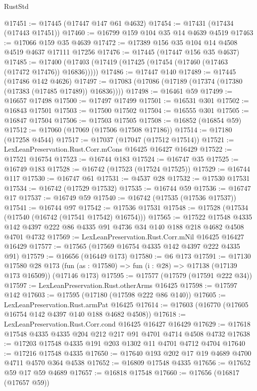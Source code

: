 \begin{lexlean}{RustStd}
\begin{coremodule}
@17451 := @17445 (@17447 @147 @61 @4632)
@17454 := @17431 (@17434 (@17443 @17451))
@17460 := @16799 @159 @104 @35 @14 @4639 @4519
@17463 := @17066 @159 @35 @4639
@17472 := @17389 @156 @35 @104 @14 @4508 @4519 @4637 @17111 @17256
@17476 := @17445 (@17447 @156 @35 @4637)
@17485 := @17400 (@17403 (@17419 (@17425 (@17454 (@17460 (@17463 (@17472 @17476)) @16836)))))
@17486 := @17447 @140
@17489 := @17445 (@17486 @142 @4626)
@17497 := @17083 (@17086 (@17189 (@17374 (@17380 (@17383 (@17485 @17489)) @16836))))
@17498 := @16461 @59
@17499 := @16657 @17498
@17500 := @17497 @17499
@17501 := @16531 @301
@17502 := @16843 @17501
@17503 := @17500 @17502
@17504 := @16555 @301
@17505 := @16847 @17504
@17506 := @17503 @17505
@17508 := @16852 (@16854 @59)
@17512 := @17060 (@17069 (@17506 @17508 @17186))
@17514 := @17180 (@17258 @4544)
@17517 := @17037 (@17047 (@17512 @17514))
@17521 := LexLeanPreservation.Rust.Corr.mCons @16425 @16427 @16429
@17522 := @17521 @16754
@17523 := @16744 @183
@17524 := @16747 @35
@17525 := @16749 @183
@17528 := @16742 (@17523 (@17524 @17525))
@17529 := @16744 @117
@17530 := @16747 @61
@17531 := @4537 @28
@17532 := @17530 @17531
@17534 := @16742 (@17529 @17532)
@17535 := @16744 @59
@17536 := @16747 @17
@17537 := @16749 @59
@17540 := @16742 (@17535 (@17536 @17537))
@17541 := @16744 @97
@17542 := @17536 @17531
@17548 := @17528 (@17534 (@17540 (@16742 (@17541 @17542) @16754)))
@17565 := @17522
    @17548
    @4335
    @142
    @4397
    @222
    @86
    @4335
    @91
    @4736
    @34
    @140
    @188
    @218
    @4682
    @4508
    @4701
    @4732
@17569 := LexLeanPreservation.Rust.Corr.mNil @16425 @16427 @16429
@17577 := @17565 (@17569 @16754 @4335 @142 @4397 @222 @4335 @91)
@17579 := @16656 (@16449 @173)
@17580 := @6 @173
@17591 := @17130
    @17580
    @28
    @173
    (fun (as : @17580) => fun (i : @28) => @17138 (@17139 @173 @16509))
    (@17146 @173)
@17595 := @17577 (@17579 (@17591 @222 @34))
@17597 := LexLeanPreservation.Rust.otherArms @16425
@17598 := @17597 @142
@17603 := @17595 (@17180 (@17598 @222 @86 @140))
@17605 := LexLeanPreservation.Rust.armPat @16425
@17614 := @17603 (@16770 (@17605 @16754 @142 @4397 @140 @188 @4682 @4508))
@17618 := LexLeanPreservation.Rust.Corr.cond @16425 @16427 @16429
@17629 := @17618 @17548 @4335 @4335 @204 @212 @217 @91 @4701 @4714 @4508 @4732
@17638 := @17203 @17548 @4335 @191 @203 @1302 @11 @4701 @4712 @4704
@17640 := @17216 @17548 @4335
@17650 := @17640 @193 @202 @17 @19 @4689 @4700 @4711 @4570 @364 @4538
@17652 := @16809 @17548 @4335
@17656 := @17652 @59 @17 @59 @4689
@17657 := @16818 @17548
@17660 := @17656 (@16817 (@17657 @59))

\end{coremodule}
\end{lexlean}
